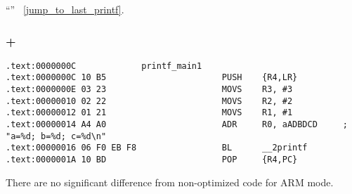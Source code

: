 ``\SwitchCaseDefaultSectionName'' 
~\ref{jump_to_last_printf}.

\subsubsection{\OptimizingKeil + \ThumbMode}

\begin{lstlisting}[caption=\OptimizingKeil + \ThumbMode]
.text:0000000C             printf_main1
.text:0000000C 10 B5                       PUSH    {R4,LR}
.text:0000000E 03 23                       MOVS    R3, #3
.text:00000010 02 22                       MOVS    R2, #2
.text:00000012 01 21                       MOVS    R1, #1
.text:00000014 A4 A0                       ADR     R0, aADBDCD     ; "a=%d; b=%d; c=%d\n"
.text:00000016 06 F0 EB F8                 BL      __2printf
.text:0000001A 10 BD                       POP     {R4,PC}
\end{lstlisting}

{There are no significant difference from non-optimized code for ARM mode}.


